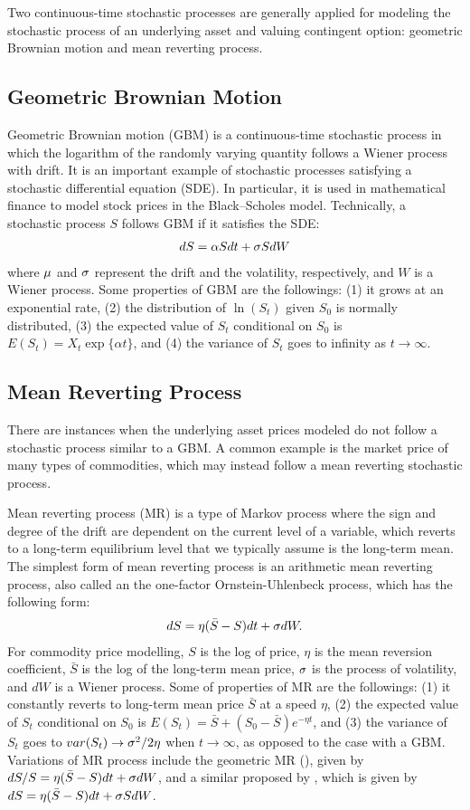 \documentclass[11pt,letter]{article}
\def\a{\alpha} \def\b{\beta} \def\g{\gamma} \def\d{\delta} \def\r{\rho}
\theoremstyle{definition}
\theoremstyle{remark}
\numberwithin{equation}{section}
\begin{document}
Two continuous-time stochastic processes are generally applied for modeling the stochastic process of an underlying asset and valuing contingent option: geometric Brownian motion and mean reverting process.


\subsection{Geometric Brownian Motion}
Geometric Brownian motion (GBM) is a continuous-time stochastic process in which the logarithm of the randomly varying quantity follows a Wiener process with drift. It is an important example of stochastic processes satisfying a stochastic differential equation (SDE). In particular, it is used in mathematical finance to model stock prices in the Black–Scholes model. Technically, a stochastic process $S$ follows GBM if it satisfies the SDE:
\begin{align*}
    dS=\a Sdt+\s SdW
\end{align*}
where $\mu$ and $\sigma$ represent the drift and the volatility, respectively, and $W$ is a Wiener process. Some properties of GBM are the followings: (1) it grows at an exponential rate, (2) the distribution of $\ln(S_t)$ given $S_0$ is normally distributed, (3) the expected value of $S_t$ conditional on $S_0$ is $E(S_t)=X_t\exp\{\a t\}$, and (4) the variance of $S_t$ goes to infinity as $t\rightarrow\infty$.

\subsection{Mean Reverting Process}
There are instances when the underlying asset prices modeled do not follow a stochastic process similar to a GBM. A common example is the market price of many types of commodities, which may instead follow a mean reverting stochastic process.

Mean reverting process (MR) is a type of Markov process where the sign and degree of the drift are dependent on the current level of a variable, which reverts to a long-term equilibrium level that we typically assume is the long-term mean. The simplest form of mean reverting process is an arithmetic mean reverting process, also called an the one-factor Ornstein-Uhlenbeck process, which has the following form:
\begin{align*}
    dS=\eta(\bar{S}-S)dt+\sigma dW.
\end{align*}
\indent For commodity price modelling, $S$ is the log of price, $\eta$ is the mean reversion coefficient, $\bar{S}$ is the log of the long-term mean price, $\sigma$ is the process of volatility, and $dW$ is a Wiener process. Some of properties of MR are the followings: (1) it constantly reverts to long-term mean price $\bar{S}$ at a speed $\eta$, (2) the expected value of $S_t$ conditional on $S_0$ is $E(S_t)=\bar{S}+(S_0-\bar{S})e^{-\eta t}$, and (3) the variance of $S_t$ goes to $var(S_t)\rightarrow\sigma^2/2\eta$ when $t\rightarrow\infty$, as opposed to the case with a GBM. Variations of MR process include the geometric MR (\cite{dixit1994investment}), given by $dS/S=\eta(\bar{S}-S)dt+\sigma dW$, and a similar proposed by \cite{bhattacharya1978project}, which is given by $dS=\eta(\bar{S}-S)dt+\sigma SdW$.
\end{document}
